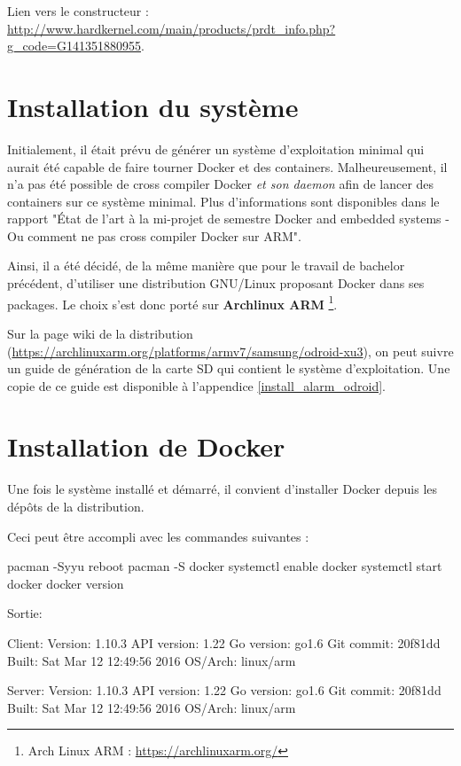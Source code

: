 \documentclass[11pt,a4paper,oneside]{report}
\newcommand{\oldreportname}{État de l’art à la mi-projet de semestre Docker and embedded systems - Ou comment ne pas cross compiler Docker sur ARM}
\begin{document}
Lien vers le constructeur : \url{http://www.hardkernel.com/main/products/prdt_info.php?g_code=G141351880955}.

\section{Installation du système}

Initialement, il était prévu de générer un système d'exploitation minimal qui aurait été capable de faire tourner Docker et des containers. Malheureusement, il n'a pas été possible de cross compiler Docker \textit{et son daemon} afin de lancer des containers sur ce système minimal. Plus d'informations sont disponibles dans le rapport "\oldreportname".

Ainsi, il a été décidé, de la même manière que pour le travail de bachelor précédent, d'utiliser une distribution GNU/Linux proposant Docker dans ses packages. Le choix s'est donc porté sur \textbf{Archlinux ARM} \footnote{Arch Linux ARM : \url{https://archlinuxarm.org/}}.

Sur la page wiki de la distribution (\url{https://archlinuxarm.org/platforms/armv7/samsung/odroid-xu3}), on peut suivre un guide de génération de la carte SD qui contient le système d'exploitation. Une copie de ce guide est disponible à l'appendice \ref{install_alarm_odroid}.


\section{Installation de Docker}
Une fois le système installé et démarré, il convient d'installer Docker depuis les dépôts de la distribution.

Ceci peut être accompli avec les commandes suivantes :

\begin{bashcode}
pacman -Syyu
reboot
pacman -S docker
systemctl enable docker
systemctl start docker
docker version
\end{bashcode}

Sortie:

\begin{bashcode}
Client:
 Version:      1.10.3
 API version:  1.22
 Go version:   go1.6
 Git commit:   20f81dd
 Built:        Sat Mar 12 12:49:56 2016
 OS/Arch:      linux/arm

Server:
 Version:      1.10.3
 API version:  1.22
 Go version:   go1.6
 Git commit:   20f81dd
 Built:        Sat Mar 12 12:49:56 2016
 OS/Arch:      linux/arm
 \end{bashcode}
\end{document}
